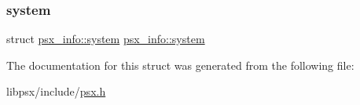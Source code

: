 \subsubsection{\texorpdfstring{system}{system}}
{\footnotesize\ttfamily struct \hyperlink{structpsx__info_1_1system}{psx\+\_\+info\+::system} \hyperlink{structpsx__info_1_1system}{psx\+\_\+info\+::system}}



The documentation for this struct was generated from the following file\+:\begin{DoxyCompactItemize}
\item 
libpsx/include/\hyperlink{psx_8h}{psx.\+h}\end{DoxyCompactItemize}

